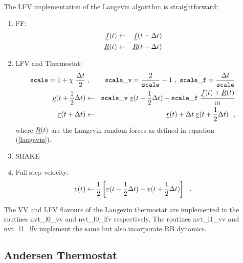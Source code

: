 The LFV implementation of the Langevin algorithm is straightforward:
\begin{enumerate}
\item FF:
\begin{eqnarray}
\mbox{$\underline{f}$}(t) &\leftarrow& \mbox{$\underline{f}$}(t - \Delta t) \nonumber \\
\mbox{$\underline{R}$}(t) &\leftarrow& \mbox{$\underline{R}$}(t - \Delta t) \\
\end{eqnarray}
\item LFV and Thermostat:
\begin{eqnarray}
{\tt scale} = 1 + \chi~\frac{\Delta t}{2} &~,~&
{\tt scale\_v} = \frac{2}{\tt scale}-1 ~,~
{\tt scale\_f} = \frac{\Delta t}{\tt scale} \nonumber \\
\mbox{$\underline{v}$}(t + {1 \over 2} \Delta t) &\leftarrow&
{\tt scale\_v}~\mbox{$\underline{v}$}(t - {1 \over 2} \Delta t) +
{\tt scale\_f}~\frac{\mbox{$\underline{f}$}(t) + \mbox{$\underline{R}$}(t)}{m} \\
\mbox{$\underline{r}$}(t + \Delta t) &\leftarrow& \mbox{$\underline{r}$}(t) + \Delta t \;
\mbox{$\underline{v}$}(t + {1 \over 2} \Delta t)~~, \nonumber
\end{eqnarray}
where $\mbox{$\underline{R}$}(t)$ are the Langevin random forces as defined in equation (\ref{langevin}).
\item SHAKE
\item Full step velocity:
\begin{equation}
\mbox{$\underline{v}$}(t) \leftarrow {1 \over 2} \left[ \mbox{$\underline{v}$}(t - {1 \over 2} \Delta t) +
\mbox{$\underline{v}$}(t + {1 \over 2} \Delta t) \right]~~.
\end{equation}
\end{enumerate}

The VV and LFV flavours of the Langevin thermostat are implemented in
the \D routines {\sc nvt\_l0\_vv} and {\sc nvt\_l0\_lfv} respectively.
The routines {\sc nvt\_l1\_vv} and {\sc nvt\_l1\_lfv} implement the
same but also incorporate RB dynamics.

\subsection{Andersen Thermostat}

